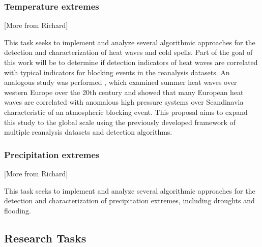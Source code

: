 \documentclass[11pt]{article}
\begin{document}

\subsubsection{Temperature extremes}

{\color{red}[More from Richard]}

This task seeks to implement and analyze several algorithmic approaches for the detection and characterization of heat waves and cold spells.  Part of the goal of this work will be to determine if detection indicators of heat waves are correlated with typical indicators for blocking events in the reanalysis datasets.  An analogous study was performed \cite{della2007summer}, which examined summer heat waves over western Europe over the 20th century and showed that many European heat waves are correlated with anomalous high pressure systems over Scandinavia characteristic of an atmospheric blocking event.  This proposal aims to expand this study to the global scale using the previously developed framework of multiple reanalysis datasets and detection algorithms.

\subsubsection{Precipitation extremes}

{\color{red}[More from Richard]}

This task seeks to implement and analyze several algorithmic approaches for the detection and characterization of precipitation extremes, including droughts and flooding.

\subsection{Research Tasks}



\end{document}
